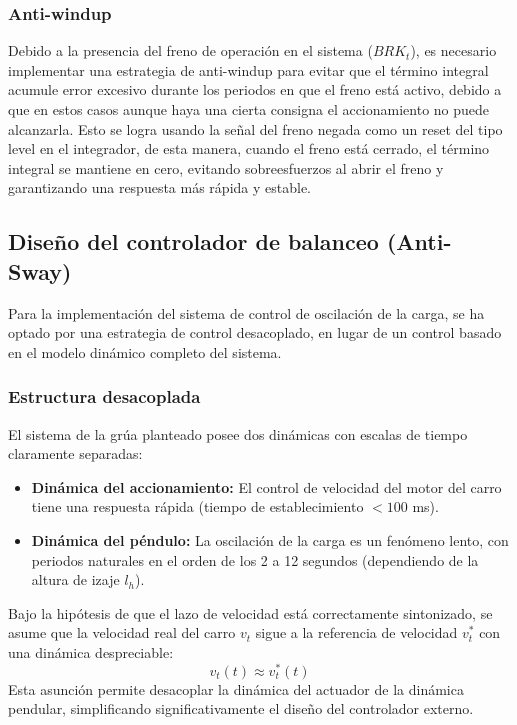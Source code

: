 \subsubsection{Anti-windup}
Debido a la presencia del freno de operación en el sistema (\textcolor{signalcolor}{$BRK_t$}), es necesario implementar una estrategia de 
anti-windup para evitar que el término integral acumule error excesivo durante los periodos en que el freno está activo, debido a que en 
estos casos aunque haya una cierta consigna el accionamiento no puede alcanzarla. Esto se logra
usando la señal del freno negada como un reset del tipo level en el integrador, de esta manera, cuando el freno está cerrado, el término integral se mantiene
en cero, evitando sobreesfuerzos al abrir el freno y garantizando una respuesta más rápida y estable. 

\subsection{Diseño del controlador de balanceo (Anti-Sway)}
Para la implementación del sistema de control de oscilación de la carga, se ha optado por una estrategia de control desacoplado, en lugar de 
un control basado en el modelo dinámico completo del sistema. 

\subsubsection{Estructura desacoplada}
El sistema de la grúa planteado posee dos dinámicas con escalas de tiempo claramente separadas:
\begin{itemize}
    \item \textbf{Dinámica del accionamiento:} El control de velocidad del motor del carro tiene una respuesta rápida (tiempo de establecimiento $< 100$ ms).
    \item \textbf{Dinámica del péndulo:} La oscilación de la carga es un fenómeno lento, con periodos naturales en el orden de los 2 a 12 segundos (dependiendo de la altura de izaje $l_h$).
\end{itemize}

Bajo la hipótesis de que el lazo de velocidad está correctamente sintonizado, se asume que la velocidad real del carro $v_t$ sigue a la referencia de velocidad $v_t^\ast$ con una dinámica despreciable:
\begin{equation}
    v_t(t) \approx v_t^\ast(t)
\end{equation}
Esta asunción permite desacoplar la dinámica del actuador de la dinámica pendular, simplificando significativamente el diseño del controlador externo.

